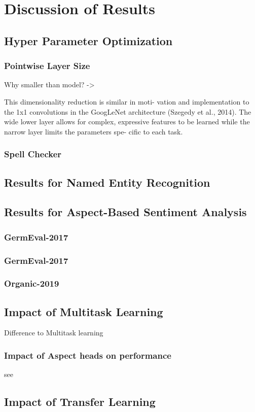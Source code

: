 \chapter{Discussion of Results}
\label{ch:discussion}

\section{Hyper Parameter Optimization}

\subsection{Pointwise Layer Size}

Why smaller than model? -> 

This dimensionality reduction is similar in moti- vation and implementation to the 1x1 convolutions in the GoogLeNet architecture (Szegedy et al., 2014). The wide lower layer allows for complex, expressive features to be learned while the narrow layer limits the parameters spe- cific to each task.

\cite{Ramsundar2015}

\subsection{Spell Checker}


\section{Results for Named Entity Recognition}

\section{Results for Aspect-Based Sentiment Analysis}

\subsection{GermEval-2017}


\subsection{GermEval-2017}

\subsection{Organic-2019}

\section{Impact of Multitask Learning}
Difference to Multitask learning

\subsection{Impact of Aspect heads on performance}

see \cite{Ramsundar2015}

\section{Impact of Transfer Learning}

